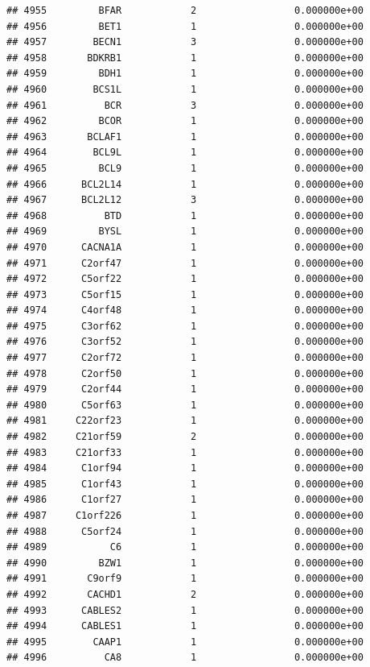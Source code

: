 \documentclass[
]{article}
\begin{document}
\begin{verbatim}
## 4955         BFAR            2                 0.000000e+00
## 4956         BET1            1                 0.000000e+00
## 4957        BECN1            3                 0.000000e+00
## 4958       BDKRB1            1                 0.000000e+00
## 4959         BDH1            1                 0.000000e+00
## 4960        BCS1L            1                 0.000000e+00
## 4961          BCR            3                 0.000000e+00
## 4962         BCOR            1                 0.000000e+00
## 4963       BCLAF1            1                 0.000000e+00
## 4964        BCL9L            1                 0.000000e+00
## 4965         BCL9            1                 0.000000e+00
## 4966      BCL2L14            1                 0.000000e+00
## 4967      BCL2L12            3                 0.000000e+00
## 4968          BTD            1                 0.000000e+00
## 4969         BYSL            1                 0.000000e+00
## 4970      CACNA1A            1                 0.000000e+00
## 4971      C2orf47            1                 0.000000e+00
## 4972      C5orf22            1                 0.000000e+00
## 4973      C5orf15            1                 0.000000e+00
## 4974      C4orf48            1                 0.000000e+00
## 4975      C3orf62            1                 0.000000e+00
## 4976      C3orf52            1                 0.000000e+00
## 4977      C2orf72            1                 0.000000e+00
## 4978      C2orf50            1                 0.000000e+00
## 4979      C2orf44            1                 0.000000e+00
## 4980      C5orf63            1                 0.000000e+00
## 4981     C22orf23            1                 0.000000e+00
## 4982     C21orf59            2                 0.000000e+00
## 4983     C21orf33            1                 0.000000e+00
## 4984      C1orf94            1                 0.000000e+00
## 4985      C1orf43            1                 0.000000e+00
## 4986      C1orf27            1                 0.000000e+00
## 4987     C1orf226            1                 0.000000e+00
## 4988      C5orf24            1                 0.000000e+00
## 4989           C6            1                 0.000000e+00
## 4990         BZW1            1                 0.000000e+00
## 4991       C9orf9            1                 0.000000e+00
## 4992       CACHD1            2                 0.000000e+00
## 4993      CABLES2            1                 0.000000e+00
## 4994      CABLES1            1                 0.000000e+00
## 4995        CAAP1            1                 0.000000e+00
## 4996          CA8            1                 0.000000e+00

\end{verbatim}
\end{document}
